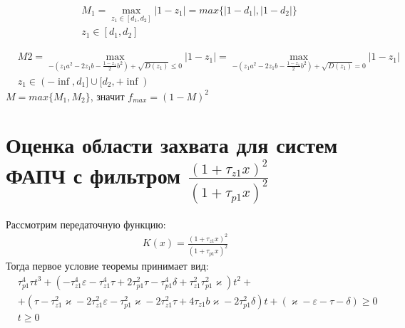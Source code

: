 \documentclass[a4paper]{article}
\begin{document}
\begin{equation}
 \begin{aligned}
&M_1 = \max\limits_{z_1\in[d_1, d_2]}{|1-z_1|} = max\{|1-d_1|, |1-d_2|\}\\
&z_1\in[d_1, d_2]
 \end{aligned}
\end{equation}

\begin{equation}
 \begin{aligned}
&M2 = \max\limits_{-(z_1 a^2-2 z_1 b - \frac{1-z_1}{2} b^2)+\sqrt{D(z_1)}  \leq 0  }{|1-z_1|} = \max\limits_{-(z_1 a^2-2 z_1 b - \frac{1-z_1}{2} b^2)+\sqrt{D(z_1)}  = 0  }{|1-z_1|}\\
&z_1\in(-\inf, d_1]\cup[d_2, +\inf)
 \end{aligned}
\end{equation} 
 $M = max\{ M_1, M_2\}$, значит $f_{max} = (1-M)^2$
 

\section{Оценка области захвата для систем ФАПЧ с фильтром $\frac{(1+\tau_{z1}x)^2}{(1+\tau_{p1}x)^2}$}
 Рассмотрим передаточную функцию:
 \begin{equation}\label{filter2}
 \begin{aligned}
K(x) = \frac{(1+\tau_{z1}x)^2}{(1+\tau_{p1}x)^2}
 \end{aligned}
\end{equation}
Тогда первое условие теоремы принимает вид:
 \begin{equation}
 \begin{aligned}
&\tau_{p1}^4\tau t^3 +(- \tau_{z1}^4\varepsilon - \tau_{z1}^4\tau + 2\tau_{p1}^2\tau- \tau_{p1}^4\delta + \tau_{z1}^2\tau_{p1}^2\varkappa)t^2  +\\
&+( \tau- \tau_{z1}^2\varkappa - 2\tau_{z1}^2\varepsilon - \tau_{p1}^2\varkappa- 2\tau_{z1}^2\tau+ 4\tau_{z1}b\varkappa- 2\tau_{p1}^2\delta)t + (\varkappa-\varepsilon - \tau - \delta)  \geq 0\\
&t \geq 0
 \end{aligned}
\end{equation}
\end{document}
